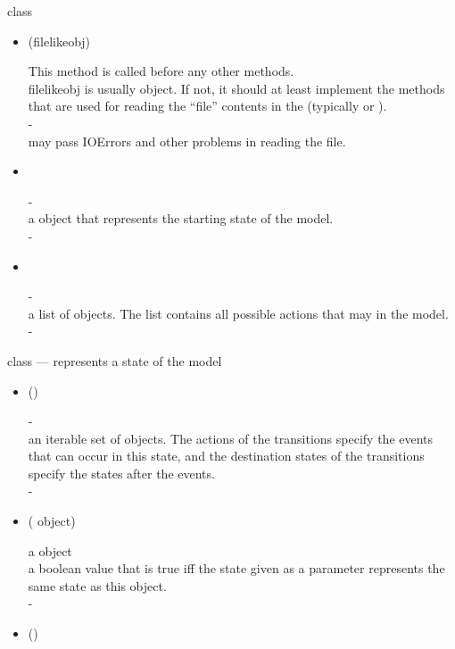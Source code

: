 \documentclass{article}
\begin{document}
 class
\begin{itemize}
\item[] (filelikeobj)
  \begin{quot}
    This method is called before any other methods.\\
     filelikeobj is usually  object. If
    not, it should at least implement the methods that are used for
    reading the ``file'' contents in the 
    (typically
     or ).\\
     -\\
     may pass IOErrors and other problems in
    reading the file.
  \end{quot}
\item[] \\
  \begin{quot}
     -\\
     a  object that represents the starting state of the model.\\
     -
  \end{quot}
\item[] \\
  \begin{quot}
     -\\
     a list of  objects. The list
    contains all possible actions that may in the model.
    \\
     -
  \end{quot}
\end{itemize}

\noindent{} class --- represents a state of the model
\begin{itemize}
\item[] ()
  \begin{quot}
     -\\
     an iterable set of  objects.
    The actions of the transitions specify the events that can occur
    in this state, and the destination states of the transitions
    specify the states after the events.
    \\
     -
  \end{quot}
\item[] ( object)
  \begin{quot}
     a  object\\
     a boolean value that is true iff the state given
    as a parameter represents the same state as this object.
    \\
     -
  \end{quot}
\item[] ()
\end{itemize}
\end{document}
